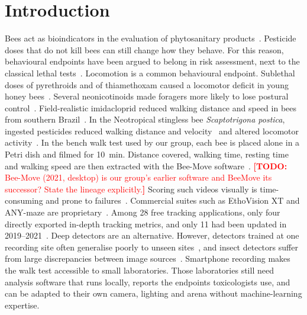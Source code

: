 \documentclass[pdflatex,sn-basic,Numbered]{sn-jnl}
\newcommand{\todo}[1]{\textcolor{red}{\textbf{[TODO:} #1\textbf{]}}}
\newcommand{\beemove}{BeeMove}
\theoremstyle{thmstyleone}%
\begin{document}
\section{Introduction}\label{sec:intro}

Bees act as bioindicators in the evaluation of phytosanitary products~\cite{lima2025analyzing}. Pesticide doses that do not kill bees can still change how they behave. For this reason, behavioural endpoints have been argued to belong in risk assessment, next to the classical lethal tests~\cite{barascou2021pesticide}. Locomotion is a common behavioural endpoint. Sublethal doses of pyrethroids and of thiamethoxam caused a locomotor deficit in young honey bees~\cite{charreton2015locomotor}. Several neonicotinoids made foragers more likely to lose postural control~\cite{williamson2014exposure}. Field-realistic imidacloprid reduced walking distance and speed in bees from southern Brazil~\cite{graefffilho2026behavioral}. In the Neotropical stingless bee \textit{Scaptotrigona postica}, ingested pesticides reduced walking distance and velocity~\cite{fardergomes2024exposure} and altered locomotor activity~\cite{piovesan2020effects}. In the bench walk test used by our group, each bee is placed alone in a Petri dish and filmed for 10~min. Distance covered, walking time, resting time and walking speed are then extracted with the Bee-Move software~\cite{libardoni2021possible}. \todo{Bee-Move (2021, desktop) is our group's earlier software and \beemove{} its successor? State the lineage explicitly.} Scoring such videos visually is time-consuming and prone to failures~\cite{lima2025analyzing}. Commercial suites such as EthoVision XT and ANY-maze are proprietary~\cite{lim2023comparison}. Among 28 free tracking applications, only four directly exported in-depth tracking metrics, and only 11 had been updated in 2019--2021~\cite{panadeiro2021review}. Deep detectors are an alternative. However, detectors trained at one recording site often generalise poorly to unseen sites~\cite{beery2018recognition}, and insect detectors suffer from large discrepancies between image sources~\cite{suto2023improving}. Smartphone recording makes the walk test accessible to small laboratories. Those laboratories still need analysis software that runs locally, reports the endpoints toxicologists use, and can be adapted to their own camera, lighting and arena without machine-learning expertise.
\end{document}
